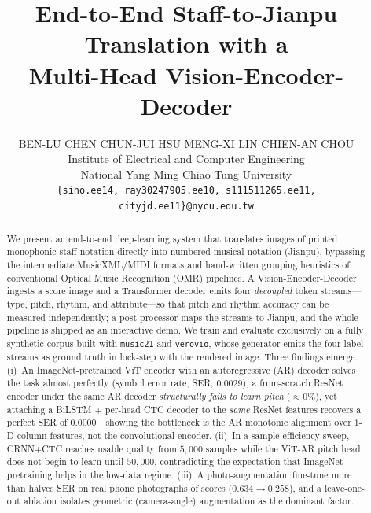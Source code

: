 \documentclass{article}
\title{End-to-End Staff-to-Jianpu Translation with a\\Multi-Head Vision-Encoder-Decoder}
\author{%
  BEN-LU CHEN \quad CHUN-JUI HSU \quad MENG-XI LIN \quad CHIEN-AN CHOU\\
  Institute of Electrical and Computer Engineering\\
  National Yang Ming Chiao Tung University\\
  \texttt{\{sino.ee14, ray30247905.ee10, s111511265.ee11, cityjd.ee11\}@nycu.edu.tw}
}
\begin{document}
\maketitle

\begin{abstract}
We present an end-to-end deep-learning system that translates images of printed
monophonic staff notation directly into numbered musical notation (Jianpu),
bypassing the intermediate MusicXML/MIDI formats and hand-written grouping
heuristics of conventional Optical Music Recognition (OMR) pipelines. A
Vision-Encoder-Decoder ingests a score image and a Transformer decoder emits four
\emph{decoupled} token streams---type, pitch, rhythm, and attribute---so that
pitch and rhythm accuracy can be measured independently; a post-processor maps
the streams to Jianpu, and the whole pipeline is shipped as an interactive demo.
We train and evaluate exclusively on a fully synthetic corpus built with
\texttt{music21} and \texttt{verovio}, whose generator emits the four label
streams as ground truth in lock-step with the rendered image. Three findings
emerge. (i)~An ImageNet-pretrained ViT encoder with an autoregressive (AR)
decoder solves the task almost perfectly (symbol error rate, SER, $0.0029$), a
from-scratch ResNet encoder under the same AR decoder \emph{structurally fails to
learn pitch} ($\approx0\%$), yet attaching a BiLSTM + per-head CTC decoder to the
\emph{same} ResNet features recovers a perfect SER of $0.0000$---showing the
bottleneck is the AR monotonic alignment over $1$-D column features, not the
convolutional encoder. (ii)~In a sample-efficiency sweep, CRNN+CTC reaches usable
quality from $5{,}000$ samples while the ViT-AR pitch head does not begin to learn
until $50{,}000$, contradicting the expectation that ImageNet pretraining helps in
the low-data regime. (iii)~A photo-augmentation fine-tune more than halves SER on
real phone photographs of scores ($0.634\!\to\!0.258$), and a leave-one-out
ablation isolates geometric (camera-angle) augmentation as the dominant factor.
\end{abstract}
















\newpage
{
\small


}
\end{document}

